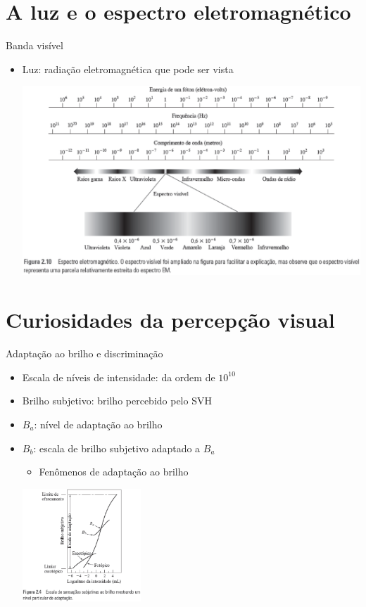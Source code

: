      \section[ slide = true]{A luz e o espectro eletromagnético}
      \begin{slide}[toc=]{Banda visível}
         \begin{itemize}[type=1]
            \item Luz: radiação eletromagnética que pode ser vista
            \begin{center}
               \includegraphics[width=.8\textwidth]{figs/fig0210}
            \end{center}
         \end{itemize}         
      \end{slide}
 
   \section[ slide = true]{Curiosidades da percepção visual}
      \begin{slide}[toc=]{Adaptação ao brilho e discriminação}
         \begin{itemize}
            \item Escala de níveis de intensidade: da ordem de $10^{10}$
            \item Brilho subjetivo: brilho percebido pelo SVH
            \item $B_a$: nível de adaptação ao brilho
            \item $B_b$: escala de brilho subjetivo adaptado a $B_a$
             \begin{itemize}
                \item Fenômenos de adaptação ao brilho
             \end{itemize}
            \begin{center}
               \includegraphics[width=0.35\textwidth]{figs/brilhosubjt}
            \end{center}
         \end{itemize}
      \end{slide}

